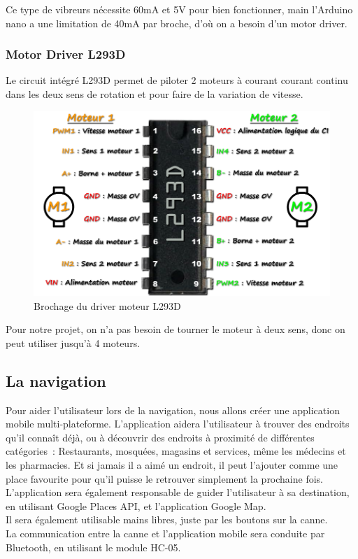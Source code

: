 \FloatBarrier

Ce type de vibreurs nécessite 60mA et 5V pour bien fonctionner, main l'Arduino nano a une limitation de 40mA par broche, d'où on a besoin d'un motor driver.

\subsubsection{Motor Driver L293D}
Le circuit intégré L293D permet de piloter 2 moteurs à courant courant continu dans les deux sens de rotation et pour faire de la variation de vitesse.

\begin{figure}[!htbp]
    \centering
    \includegraphics[width=13cm]{assets/L293D/pinout.png}
    \caption{Brochage du driver moteur L293D \cite{l293d-electrotoile}}
\end{figure}

\FloatBarrier

Pour notre projet, on n'a pas besoin de tourner le moteur à deux sens, donc on peut utiliser jusqu'à 4 moteurs.

\subsection{La navigation}

Pour aider l’utilisateur lors de la navigation, nous allons créer une application mobile multi-plateforme.
L’application aidera l’utilisateur à trouver des endroits qu’il connaît déjà, ou à découvrir des endroits à proximité de différentes catégories : Restaurants, mosquées, magasins et services, même les médecins et les pharmacies. Et si jamais il a aimé un endroit, il peut l'ajouter comme une place favourite pour qu'il puisse le retrouver simplement la prochaine fois.\\
L’application sera également responsable de guider l’utilisateur à sa destination, en utilisant Google Places API, et l’application Google Map.\\
Il sera également utilisable mains libres, juste par les boutons sur la canne. \\
La communication entre la canne et l'application mobile sera conduite par Bluetooth, en utilisant le module HC-05.

